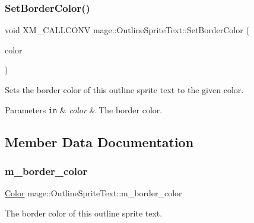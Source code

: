 \subsubsection{\texorpdfstring{Set\+Border\+Color()}{SetBorderColor()}\hspace{0.1cm}{\footnotesize\ttfamily [3/3]}}
{\footnotesize\ttfamily void X\+M\+\_\+\+C\+A\+L\+L\+C\+O\+NV mage\+::\+Outline\+Sprite\+Text\+::\+Set\+Border\+Color (\begin{DoxyParamCaption}\item[{F\+X\+M\+V\+E\+C\+T\+OR}]{color }\end{DoxyParamCaption})\hspace{0.3cm}{\ttfamily [noexcept]}}

Sets the border color of this outline sprite text to the given color.


\begin{DoxyParams}[1]{Parameters}
\mbox{\tt in}  & {\em color} & The border color. \\
\hline
\end{DoxyParams}


\subsection{Member Data Documentation}
\hypertarget{classmage_1_1_outline_sprite_text_a19301d370498a08759445f415da78822}{}\label{classmage_1_1_outline_sprite_text_a19301d370498a08759445f415da78822} 
\subsubsection{\texorpdfstring{m\+\_\+border\+\_\+color}{m\_border\_color}}
{\footnotesize\ttfamily \hyperlink{structmage_1_1_color}{Color} mage\+::\+Outline\+Sprite\+Text\+::m\+\_\+border\+\_\+color\hspace{0.3cm}{\ttfamily [private]}}

The border color of this outline sprite text. 